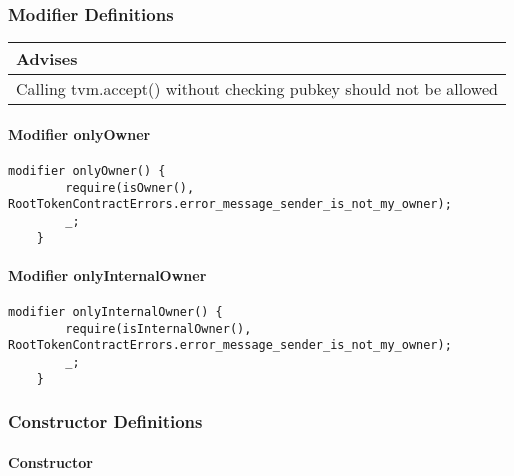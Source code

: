 \subsubsection{Modifier Definitions}


\ifsoldraft
\noindent\begin{tabular}{|p{12cm}|}\hline
\rowcolor{green}Advises
\\\hline
Calling tvm.accept() without checking pubkey should not be allowed
\\\hline\end{tabular}
\fi

\paragraph{Modifier onlyOwner}


\begin{lstlisting}[firstnumber=458]
    modifier onlyOwner() {
        require(isOwner(), RootTokenContractErrors.error_message_sender_is_not_my_owner);
        _;
    }
\end{lstlisting}

\paragraph{Modifier onlyInternalOwner}


\begin{lstlisting}[firstnumber=463]
    modifier onlyInternalOwner() {
        require(isInternalOwner(), RootTokenContractErrors.error_message_sender_is_not_my_owner);
        _;
    }
\end{lstlisting}

\subsubsection{Constructor Definitions}


\paragraph{Constructor}


